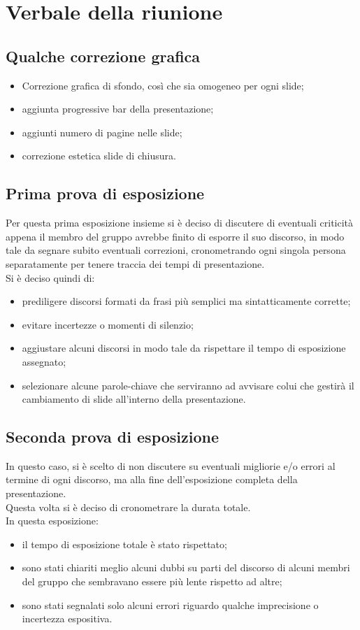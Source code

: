 \section{Verbale della riunione}
\subsection{Qualche correzione grafica}
\begin{itemize}
\item Correzione grafica di sfondo, così che sia omogeneo per ogni slide;
\item aggiunta progressive bar della presentazione;
\item aggiunti numero di pagine nelle slide;
\item correzione estetica slide di chiusura.
\end{itemize}

\subsection{Prima prova di esposizione}
Per questa prima esposizione insieme si è deciso di discutere di eventuali criticità appena il membro del gruppo avrebbe finito di esporre il suo discorso, in modo tale da segnare subito eventuali correzioni, cronometrando ogni singola persona separatamente per tenere traccia dei tempi di presentazione.
\\Si è deciso quindi di:
\begin{itemize}
\item prediligere discorsi formati da frasi più semplici ma sintatticamente corrette;
\item evitare incertezze o momenti di silenzio;
\item aggiustare alcuni discorsi in modo tale da rispettare il tempo di esposizione assegnato;
\item selezionare alcune parole-chiave che serviranno ad avvisare colui che gestirà il cambiamento di slide all'interno della presentazione.
\end{itemize}

\subsection{Seconda prova di esposizione}
In questo caso, si è scelto di non discutere su eventuali migliorie e/o errori al termine di ogni discorso, ma alla fine dell'esposizione completa della presentazione. \\Questa volta si è deciso di cronometrare la durata totale.
\\In questa esposizione: 
\begin{itemize}
\item il tempo di esposizione totale è stato rispettato;
\item sono stati chiariti meglio alcuni dubbi su parti del discorso di alcuni membri del gruppo che sembravano essere più lente rispetto ad altre;
\item sono stati segnalati solo alcuni errori riguardo qualche imprecisione o incertezza espositiva.
\end{itemize}
 
